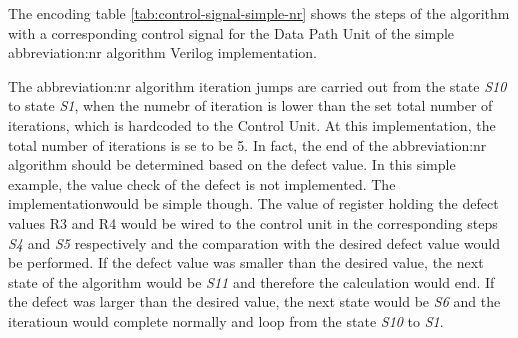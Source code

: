 \documentclass[a4paper, twoside, 11pt]{article}
\begin{document}
            The encoding table \ref{tab:control-signal-simple-nr} shows the steps of the algorithm with a corresponding control signal for the Data Path Unit of the simple \gls{abbreviation:nr} algorithm Verilog implementation.\par
            The \gls{abbreviation:nr} algorithm iteration jumps are carried out from the state \textit{S10} to state \textit{S1}, when the numebr of iteration is lower than the set total number of iterations, which is hardcoded to the Control Unit. At this implementation, the total number of iterations is se to be 5. In fact, the end of the \gls{abbreviation:nr} algorithm should be determined based on the defect value. In this simple example, the value check of the defect is not implemented. The implementationwould be simple though. The value of register holding the defect values R3 and R4 would be wired to the control unit in the corresponding steps \textit{S4} and \textit{S5} respectively and the comparation with the desired defect value would be performed. If the defect value was smaller than the desired value, the next state of the algorithm would be \textit{S11} and therefore the calculation would end. If the defect was larger than the desired value, the next state would be \textit{S6} and the iteratioun would complete normally and loop from the state \textit{S10} to \textit{S1}.
\end{document}
